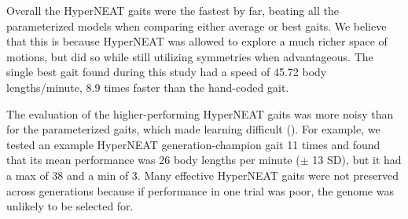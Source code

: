 

Overall the HyperNEAT gaits
were the fastest by far, beating all the parameterized models when
comparing either average or best gaits.  We believe that this is
because HyperNEAT was allowed to explore a much richer space of
motions, but did so while still utilizing symmetries when
advantageous.  The single best gait found during this study had a
speed of 45.72 body lengths/minute, 
8.9 times faster than the hand-coded gait.


The evaluation of the higher-performing HyperNEAT gaits was more noisy than
for the parameterized gaits, which made learning difficult
(). For example, we tested an example HyperNEAT
generation-champion gait 11 times and found that its mean performance
was 26 body lengths per minute ($\pm$ 13 SD), but it had a max of 38
and a min of 3.  Many effective HyperNEAT gaits were not preserved
across generations because if performance in one trial was poor, the
genome was unlikely to be selected for.



